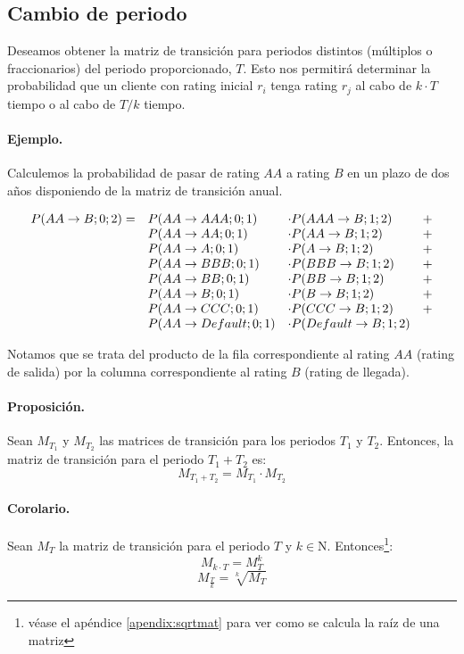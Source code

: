 \subsection{Cambio de periodo}

Deseamos obtener la matriz de transici\'on para periodos distintos (m\'ultiplos o 
fraccionarios) del periodo proporcionado, $T$. Esto nos permitir\'a determinar la 
probabilidad que un cliente con rating inicial $r_i$ tenga rating $r_j$ al cabo 
de $k \cdot T$ tiempo o al cabo de $T/k$ tiempo.

\paragraph{Ejemplo.} Calculemos la probabilidad de pasar de rating $AA$ a
rating $B$ en un plazo de dos a\~nos disponiendo de la matriz de transici\'on anual.

\begin{displaymath}
\begin{array}{llll}
P(AA \to B;0;2) = & P(AA \to AAA;0;1)     & \cdot P(AAA \to B;1;2)     & + \cr
                  & P(AA \to AA;0;1)      & \cdot P(AA \to B;1;2)      & + \cr
                  & P(AA \to A;0;1)       & \cdot P(A \to B;1;2)       & + \cr
                  & P(AA \to BBB;0;1)     & \cdot P(BBB \to B;1;2)     & + \cr
                  & P(AA \to BB;0;1)      & \cdot P(BB \to B;1;2)      & + \cr
                  & P(AA \to B;0;1)       & \cdot P(B \to B;1;2)       & + \cr
                  & P(AA \to CCC;0;1)     & \cdot P(CCC \to B;1;2)     & + \cr
                  & P(AA \to Default;0;1) & \cdot P(Default \to B;1;2) &
\end{array}
\end{displaymath}

Notamos que se trata del producto de la fila correspondiente al rating $AA$ 
(rating de salida) por la columna correspondiente al rating $B$ (rating de 
llegada).

\paragraph{Proposici\'on.} Sean $M_{T_1}$ y $M_{T_2}$ las matrices de transici\'on
para los periodos $T_1$ y $T_2$. Entonces, la matriz de transici\'on para el
periodo $T_1+T_2$ es:
\begin{displaymath}
M_{T_1+T_2} = M_{T_1} \cdot M_{T_2}
\end{displaymath}

\paragraph{Corolario.} Sean $M_{T}$ la matriz de transici\'on para el periodo 
$T$ y $k \in \mathrm{N}$. Entonces\footnote{v\'ease el ap\'endice \ref{apendix:sqrtmat} 
para ver como se calcula la ra\'iz de una matriz}:
\begin{displaymath}
M_{k \cdot T} = M_{T}^k
\end{displaymath}
\begin{displaymath}
M_{\frac{T}{k}} = \sqrt[k]{M_{T}}
\end{displaymath}


